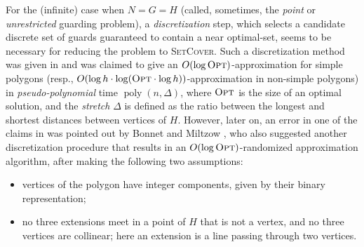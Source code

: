\documentclass[a4paper,11pt]{article}
\newcommand{\poly}{\operatorname{poly}}
\def \OPT {\textsc{Opt}}
\begin{document}
For the  (infinite) case when $N=G=H$ (called, sometimes, the {\it point} or {\it unrestricted} guarding problem), a {\it discretization} step, which selects a candidate discrete set of guards guaranteed to contain a near optimal-set, seems to be necessary for reducing the problem to \textsc{SetCover}. Such a discretization method was given in \cite{DKDS07} and was claimed to give an $O(\log\OPT)$-approximation for simple polygons (resp., $O(\log h\cdot\log(\OPT\cdot\log h))$-approximation in non-simple polygons) in {\it pseudo-polynomial} time $\poly(n,\Delta)$, where $\OPT$ is the size of an optimal solution, and the {\it stretch} $\Delta$ is defined as the ratio between the longest and shortest distances between vertices of $H$. However, later on, an error in one of the claims in \cite{DKDS07} was pointed out by Bonnet and Miltzow \cite{BM16},  who also suggested another discretization procedure that results in an $O(\log\OPT)$-randomized approximation algorithm, after making the following two assumptions:
\begin{itemize}
	\item[(A1)] vertices of the polygon have integer components, given by their binary representation; 
	\item[(A2)] no three extensions meet in a point of $H$ that is not a vertex, and no three vertices are collinear; here an extension is a line passing through two vertices.
\end{itemize}	                                                                                                                      
\end{document}
